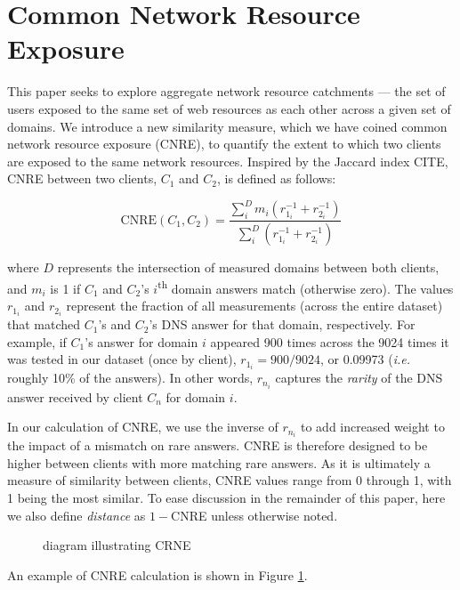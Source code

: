 \section{Common Network Resource Exposure} \label{sect:cnre}

This paper seeks to explore aggregate network resource catchments --- the set of
users exposed to the same set of web resources as each other across a given set
of domains. We introduce a new similarity measure, which we have coined common
network resource exposure (CNRE), to quantify the extent to which two clients
are exposed to the same network resources. Inspired by the Jaccard index CITE,
CNRE between two clients, $C_1$ and $C_2$, is defined as follows:

\[ \textrm{CNRE}(C_1, C_2) = \frac{ \sum_{i}^D  m_{i} (r_{1_i}^{-1}+r_{2_i}^{-1})}{ \sum_{i}^D (r_{1_i}^{-1}+r_{2_i}^{-1})} \]

where $D$ represents the intersection of measured domains between both clients, 
and $m_{i}$ is 1 if $C_{1}$ and $C_{2}$'s
$i$\textsuperscript{th} domain answers match (otherwise zero). The values
$r_{1_i}$ and $r_{2_i}$ represent the fraction of all measurements (across the
entire dataset) that matched $C_1$'s and $C_2$'s DNS answer for that domain,
respectively. For example, if $C_1$'s answer for domain $i$ appeared 900 times
across the 9024 times it was tested in our dataset (once by client), 
\(r_{1_i} =  900 / 9024\), or 0.09973 (\emph{i.e.} roughly 10\% of the answers). 
In other words, $r_{n_i}$ captures the
\emph{rarity} of the DNS answer received by client $C_n$ for domain $i$.

In our calculation of CNRE, we use the inverse of $r_{n_i}$ to add increased
weight to the impact of a mismatch on rare answers. CNRE is therefore designed
to be higher between clients with more matching rare answers. As it is
ultimately a measure of similarity between clients, CNRE values range from 0
through 1, with 1 being the most similar. To ease discussion in the remainder of
this paper, here we also define \emph{distance} as \(1 - \)CNRE unless otherwise
noted.

\begin{figure}
    \caption{diagram illustrating CRNE}
    \label{fig:cnre}
\end{figure}

An example of CNRE calculation is shown in Figure \ref{fig:cnre}.

